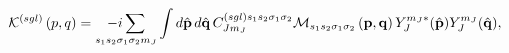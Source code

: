 \begin{equation}
\mathcal{K}^{\left( sgl\right) }\left( p,q\right) =\underset{%
s_{1}s_{2}\sigma _{1}\sigma _{2}m_{J}}{-i\sum }\int d\hat{\mathbf{p}}\,d%
\hat{\mathbf{q}}\,C_{Jm_{J}}^{\left( sgl\right) s_{1}s_{2}\sigma
_{1}\sigma _{2}}\mathcal{M}_{s_{1}s_{2}\sigma _{1}\sigma _{2}}\left( \mathbf{%
p,q}\right) Y_{J}^{m_{J}\ast }(\hat{\mathbf{p}})Y_{J}^{m_{J}}(\hat{%
\mathbf{q}}),
\end{equation}

